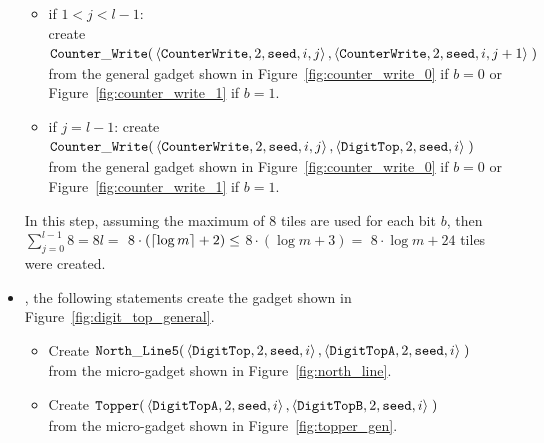 \begin{itemize}
\begin{itemize}
        \item if $1 < j < l-1$:\\ create
        $\begin{aligned}[t]
            \cwrite(&\left\langle {\tt CounterWrite}, 2, {\tt seed}, i, j \right\rangle, \left\langle {\tt CounterWrite}, 2, {\tt seed}, i, j + 1 \right\rangle \;)
        \end{aligned}$\\from the general gadget shown in Figure~\ref{fig:counter_write_0} if $b = 0$ or Figure~\ref{fig:counter_write_1} if $b = 1$.

        \item if $j = l-1$: create
        $\begin{aligned}[t]
            \cwrite(&\left\langle {\tt CounterWrite}, 2, {\tt seed}, i, j \right\rangle, \left\langle {\tt DigitTop}, 2, {\tt seed}, i \right\rangle \;)
        \end{aligned}$\\from the general gadget shown in Figure~\ref{fig:counter_write_0} if $b = 0$ or Figure~\ref{fig:counter_write_1} if $b = 1$.
    \end{itemize}
    In this step, assuming the maximum of 8 tiles are used for each bit $b$, then
    $\sum^{l-1}_{j=0} 8 = 8l =$
    $8 \cdot \left( \ceil*{\log m} + 2 \right) \leq$
    $8 \cdot \left( {\log m} + 3 \right) =$
    $8 \cdot {\log m} + 24$ tiles were created.

    \item {\dtop}, the following statements create the gadget shown in Figure~\ref{fig:digit_top_general}.
    \begin{itemize}
        \item Create
        $\begin{aligned}[t]
            {\tt North\_Line5}(& \left \langle {\tt DigitTop},  2, {\tt seed} , i \right\rangle,
                                 \left \langle {\tt DigitTopA}, 2, {\tt seed} , i \right\rangle \;)
        \end{aligned}$\\ from the micro-gadget shown in Figure~\ref{fig:north_line}.

        \item Create
        $\begin{aligned}[t]
            {\tt Topper}(& \left \langle {\tt DigitTopA}, 2, {\tt seed}, i \right\rangle,
                           \left \langle {\tt DigitTopB}, 2, {\tt seed}, i \right\rangle \;)
        \end{aligned}$\\ from the micro-gadget shown in Figure~\ref{fig:topper_gen}.


\end{itemize}
\end{itemize}

